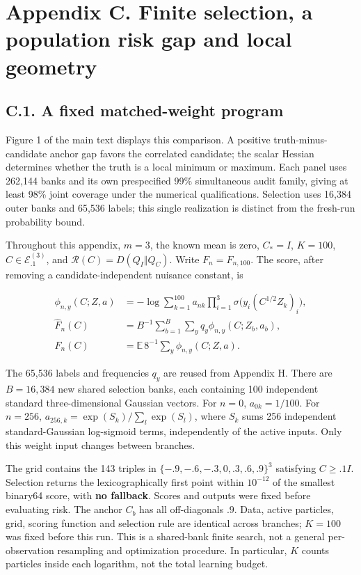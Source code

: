 \documentclass{article}
\begin{document}
\clearpage

\section*{Appendix C. Finite selection, a population risk gap and local
geometry}\label{appendix-c.-finite-selection-a-population-risk-gap-and-local-geometry}

\subsection*{C.1. A fixed matched-weight
program}\label{c.1.-a-fixed-matched-weight-program}

Figure 1 of the main text displays this comparison. A positive
truth-minus-candidate anchor gap favors the correlated candidate; the
scalar Hessian determines whether the truth is a local minimum or
maximum. Each panel uses 262,144 banks and its own prespecified 99\%
simultaneous audit family, giving at least 98\% joint coverage under the
numerical qualifications. Selection uses 16,384 outer banks and 65,536
labels; this single realization is distinct from the fresh-run
probability bound.

Throughout this appendix, \(m=3\), the known mean is zero, \(C_*=I\),
\(K=100\), \(C\in\mathcal E_{.1}^{(3)}\), and
\(\mathcal R(C)=D(Q_I\Vert Q_C)\). Write \(F_n=F_{n,100}\). The score,
after removing a candidate-independent nuisance constant, is

\[
\begin{aligned}
\phi_{n,y}(C;Z,a)&=-\log\sum_{k=1}^{100}a_{nk}\prod_{i=1}^3\sigma\bigl(y_i(C^{1/2}Z_k)_i\bigr),\\
\widehat F_n(C)&=B^{-1}\sum_{b=1}^B\sum_yq_y\phi_{n,y}(C;Z_b,a_b),\\
F_n(C)&=\mathbb E\,8^{-1}\sum_y\phi_{n,y}(C;Z,a).
\end{aligned}
\tag{C.1}
\]

The 65,536 labels and frequencies \(q_y\) are reused from Appendix H.
There are \(B=16,384\) new shared selection banks, each containing 100
independent standard three-dimensional Gaussian vectors. For \(n=0\),
\(a_{0k}=1/100\). For \(n=256\),
\(a_{256,k}=\exp(S_k)/\sum_l\exp(S_l)\), where \(S_k\) sums 256
independent standard-Gaussian log-sigmoid terms, independently of the
active inputs. Only this weight input changes between branches.

The grid contains the 143 triples in \(\{-.9,-.6,-.3,0,.3,.6,.9\}^3\)
satisfying \(C\ge.1I\). Selection returns the lexicographically first
point within \(10^{-12}\) of the smallest binary64 score, with
\textbf{no fallback}. Scores and outputs were fixed before evaluating
risk. The anchor \(C_b\) has all off-diagonals \(.9\). Data, active
particles, grid, scoring function and selection rule are identical
across branches; \(K=100\) was fixed before this run. This is a
shared-bank finite search, not a general per-observation resampling and
optimization procedure. In particular, \(K\) counts particles inside
each logarithm, not the total learning budget.
\end{document}
